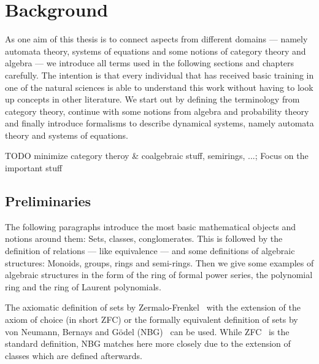 \chapter{Background}\label{\positionnumber} 
    As one aim of this thesis is to connect aspects from different domains --- namely automata theory, systems of equations and some notions of category theory and algebra --- we introduce all terms used in the following sections and chapters carefully. The intention is that every individual that has received basic training in one of the natural sciences is able to understand this work without having to look up concepts in other literature.
    We start out by defining the terminology from category theory, continue with some notions from algebra and probability theory and finally introduce formalisms to describe dynamical systems, namely automata theory and systems of equations.
    
    TODO minimize category theroy & coalgebraic stuff, semirings, ...; Focus on the important stuff
    
        \section{Preliminaries}
            The following paragraphs introduce the most basic mathematical objects and notions around them: Sets, classes, conglomerates. This is followed by the definition of relations --- like equivalence --- and some definitions of algebraic structures: Monoids, groups, rings and semi-rings.
            Then we give some examples of algebraic structures in the form of the ring of formal power series, the polynomial ring and the ring of Laurent polynomials.
        
        
            The axiomatic definition of sets by Zermalo-Frenkel~\autocite{ZF} with the extension of the axiom of choice (in short ZFC) or the formally equivalent definition of sets by von Neumann, Bernays and Gödel (NBG)~\autocite{NBG} can be used. While ZFC~\autocite{ZFC} is the standard definition, NBG matches here more closely due to the extension of classes which are defined afterwards. \\
                
